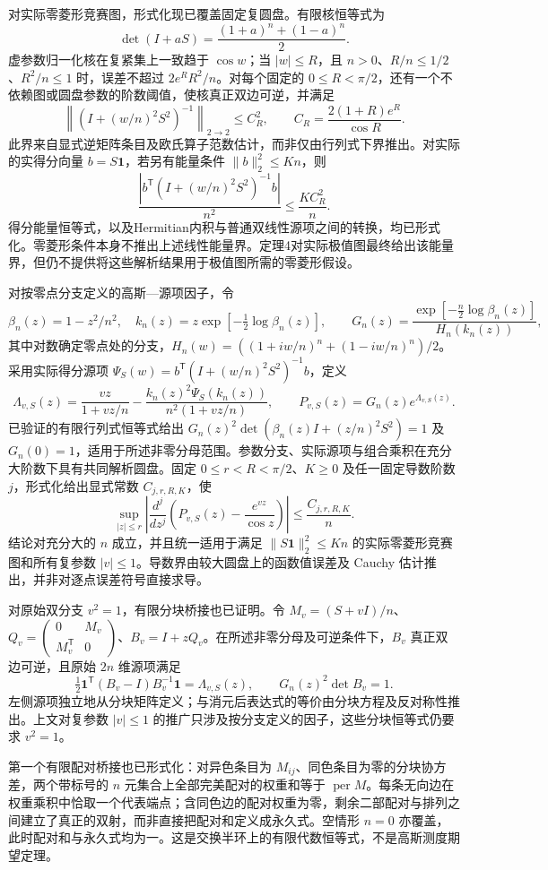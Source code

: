 \documentclass[UTF8,11pt,fontset=fandol]{ctexart}
\begin{document}
对实际零菱形竞赛图，形式化现已覆盖固定复圆盘。有限核恒等式为
\[
\det(I+aS)=\frac{(1+a)^n+(1-a)^n}{2}.
\]
虚参数归一化核在复紧集上一致趋于 $\cos w$；当 $|w|\le R$，且 $n>0$、$R/n\le1/2$、$R^2/n\le1$ 时，误差不超过 $2e^R R^2/n$。对每个固定的 $0\le R<\pi/2$，还有一个不依赖图或圆盘参数的阶数阈值，使核真正双边可逆，并满足
\[
\left\|(I+(w/n)^2S^2)^{-1}\right\|_{2\to2}\le C_R^2,
\qquad C_R=\frac{2(1+R)e^R}{\cos R}.
\]
此界来自显式逆矩阵条目及欧氏算子范数估计，而非仅由行列式下界推出。对实际的实得分向量 $b=S\mathbf1$，若另有能量条件 $\lVert b\rVert_2^2\le Kn$，则
\[
\frac{\left|b^{\mathsf T}(I+(w/n)^2S^2)^{-1}b\right|}{n^2}
\le\frac{KC_R^2}{n}.
\]
得分能量恒等式，以及Hermitian内积与普通双线性源项之间的转换，均已形式化。零菱形条件本身不推出上述线性能量界。定理4对实际极值图最终给出该能量界，但仍不提供将这些解析结果用于极值图所需的零菱形假设。

对按零点分支定义的高斯—源项因子，令
\[
 \beta_n(z)=1-z^2/n^2,\quad k_n(z)=z\exp[-\tfrac12\log\beta_n(z)],\qquad
 G_n(z)=\frac{\exp[-\tfrac n2\log\beta_n(z)]}{H_n(k_n(z))},
\]
其中对数确定零点处的分支，$H_n(w)=((1+iw/n)^n+(1-iw/n)^n)/2$。采用实际得分源项
$\Psi_S(w)=b^{\mathsf T}(I+(w/n)^2S^2)^{-1}b$，定义
\[
 \Lambda_{v,S}(z)=\frac{vz}{1+vz/n}
 -\frac{k_n(z)^2\Psi_S(k_n(z))}{n^2(1+vz/n)},\qquad
 P_{v,S}(z)=G_n(z)e^{\Lambda_{v,S}(z)}.
\]
已验证的有限行列式恒等式给出
$G_n(z)^2\det(\beta_n(z)I+(z/n)^2S^2)=1$ 及 $G_n(0)=1$，适用于所述非零分母范围。参数分支、实际源项与组合乘积在充分大阶数下具有共同解析圆盘。固定 $0\le r<R<\pi/2$、$K\ge0$ 及任一固定导数阶数 $j$，形式化给出显式常数 $C_{j,r,R,K}$，使
\[
 \sup_{|z|\le r}\left|\frac{d^j}{dz^j}
 \left(P_{v,S}(z)-\frac{e^{vz}}{\cos z}\right)\right|
 \le \frac{C_{j,r,R,K}}n.
\]
结论对充分大的 $n$ 成立，并且统一适用于满足 $\|S\mathbf1\|_2^2\le Kn$ 的实际零菱形竞赛图和所有复参数 $|v|\le1$。导数界由较大圆盘上的函数值误差及 Cauchy 估计推出，并非对逐点误差符号直接求导。

对原始双分支 $v^2=1$，有限分块桥接也已证明。令 $M_v=(S+vI)/n$、$Q_v=\left(\begin{smallmatrix}0&M_v\\M_v^{\mathsf T}&0\end{smallmatrix}\right)$、$B_v=I+zQ_v$。在所述非零分母及可逆条件下，$B_v$ 真正双边可逆，且原始 $2n$ 维源项满足
\[
 \tfrac12\mathbf1^{\mathsf T}(B_v-I)B_v^{-1}\mathbf1=\Lambda_{v,S}(z),
 \qquad G_n(z)^2\det B_v=1.
\]
左侧源项独立地从分块矩阵定义；与消元后表达式的等价由分块方程及反对称性推出。上文对复参数 $|v|\le1$ 的推广只涉及按分支定义的因子，这些分块恒等式仍要求 $v^2=1$。

第一个有限配对桥接也已形式化：对异色条目为 $M_{ij}$、同色条目为零的分块协方差，两个带标号的 $n$ 元集合上全部完美配对的权重和等于 $\operatorname{per}M$。每条无向边在权重乘积中恰取一个代表端点；含同色边的配对权重为零，剩余二部配对与排列之间建立了真正的双射，而非直接把配对和定义成永久式。空情形 $n=0$ 亦覆盖，此时配对和与永久式均为一。这是交换半环上的有限代数恒等式，不是高斯测度期望定理。
\end{document}
